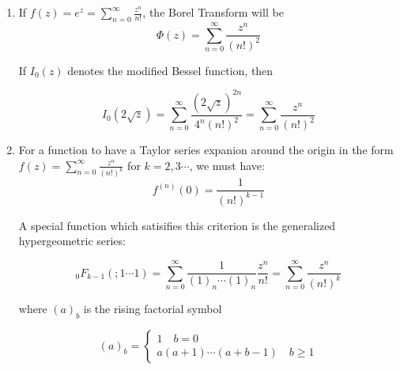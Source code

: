 \documentclass[12pt]{article}%
\newcommand{\infsum}[1][0]{\sum^{\infty}_{n = {#1}}}
\begin{document}
\begin{enumerate}
\item

If $f(z) = e^z = \infsum \frac{z^n}{n!}$, the Borel Transform will be \[\Phi(z) = \infsum \frac{z^n}{(n!)^2}\]

If $I_0(z)$ denotes the modified Bessel function, then

\[I_0(2\sqrt{z}) = \infsum \frac{(2\sqrt{z})^{2n}}{4^n(n!)^2} = \infsum \frac{z^n}{(n!)^2} \]

\item
For a function to have a Taylor series expanion around the origin in the form $f(z) = \infsum \frac{z^n}{(n!)^k}$ for $k = 2,3 \cdots$, we must have:
\[ f^{(n)}(0) = \frac{1}{(n!)^{k-1}} \]

A special function which satisifies this criterion is the generalized hypergeometric series:

\[_0F_{k-1}(;1\cdots 1) =\infsum \frac{1}{(1)_n\cdots (1)_n} \frac{z^n}{n!} = \infsum \frac{z^n}{(n!)^k}\]

where $(a)_b$ is the rising factorial symbol

\[ (a)_b = \begin{cases}
    1 \quad b = 0 \\
    a(a+1)\cdots(a+b-1) \quad b \geq 1
\end{cases} \]

\end{enumerate}
\end{document}
